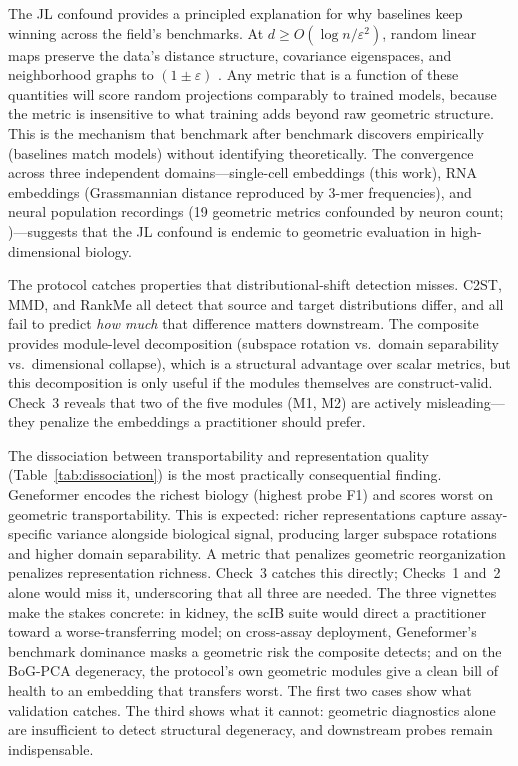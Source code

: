 \documentclass[10pt,letterpaper]{article}
\begin{document}
The JL confound provides a principled explanation for why baselines keep winning across the field's benchmarks. At $d \geq O(\log n / \varepsilon^2)$, random linear maps preserve the data's distance structure, covariance eigenspaces, and neighborhood graphs to $(1 \pm \varepsilon)$ \citep{johnsonlindenstrauss1984}. Any metric that is a function of these quantities will score random projections comparably to trained models, because the metric is insensitive to what training adds beyond raw geometric structure. This is the mechanism that benchmark after benchmark discovers empirically (baselines match models) without identifying theoretically. The convergence across three independent domains---single-cell embeddings (this work), RNA embeddings (Grassmannian distance reproduced by 3-mer frequencies), and neural population recordings (19 geometric metrics confounded by neuron count; \citealp{tower2026bracket})---suggests that the JL confound is endemic to geometric evaluation in high-dimensional biology.

The protocol catches properties that distributional-shift detection misses. C2ST, MMD, and RankMe all detect that source and target distributions differ, and all fail to predict \emph{how much} that difference matters downstream. The composite provides module-level decomposition (subspace rotation vs.\ domain separability vs.\ dimensional collapse), which is a structural advantage over scalar metrics, but this decomposition is only useful if the modules themselves are construct-valid. Check~3 reveals that two of the five modules (M1, M2) are actively misleading---they penalize the embeddings a practitioner should prefer.

The dissociation between transportability and representation quality (Table~\ref{tab:dissociation}) is the most practically consequential finding. Geneformer encodes the richest biology (highest probe F1) and scores worst on geometric transportability. This is expected: richer representations capture assay-specific variance alongside biological signal, producing larger subspace rotations and higher domain separability. A metric that penalizes geometric reorganization penalizes representation richness. Check~3 catches this directly; Checks~1 and~2 alone would miss it, underscoring that all three are needed. The three vignettes make the stakes concrete: in kidney, the scIB suite would direct a practitioner toward a worse-transferring model; on cross-assay deployment, Geneformer's benchmark dominance masks a geometric risk the composite detects; and on the BoG-PCA degeneracy, the protocol's own geometric modules give a clean bill of health to an embedding that transfers worst. The first two cases show what validation catches. The third shows what it cannot: geometric diagnostics alone are insufficient to detect structural degeneracy, and downstream probes remain indispensable.
\end{document}

